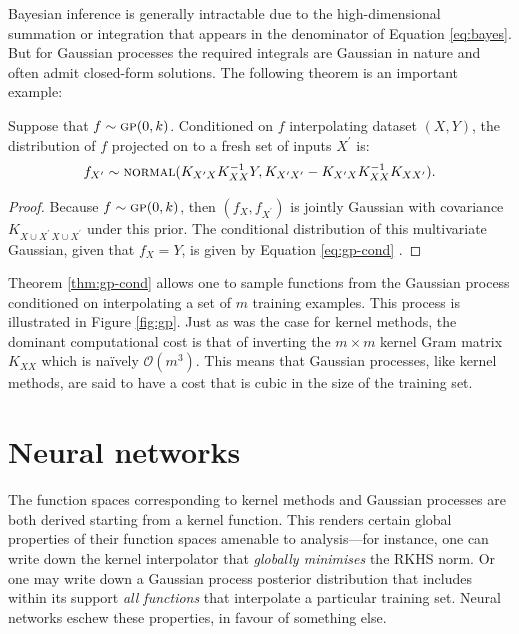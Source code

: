 \begin{refsection}
Bayesian inference is generally intractable due to the high-dimensional summation or integration that appears in the denominator of Equation \ref{eq:bayes}. But for Gaussian processes the required integrals are Gaussian in nature and often admit closed-form solutions. The following theorem is an important example:
\begin{theorem}\label{thm:gp-cond} Suppose that $f\sim\textsc{gp}(0,k)$. Conditioned on $f$ interpolating dataset $(X,Y)$, the distribution of $f$ projected on to a fresh set of inputs $X^\prime$ is:
\begin{equation}\label{eq:gp-cond}
    f_{X^\prime} \sim \textsc{normal}(K_{X^\prime X}K_{XX}^{-1}Y, K_{X^\prime X^\prime}-K_{X^\prime X}K_{XX}^{-1}K_{X X^\prime}).
\end{equation}
\end{theorem}
\begin{proof}
    Because $f\sim\textsc{gp}(0,k)$, then $(f_X, f_{X^\prime})$ is jointly Gaussian with covariance $K_{X\cup X^\prime\,X\cup X^\prime}$ under this prior. The conditional distribution of this multivariate Gaussian, given that $f_X=Y$, is given by Equation \ref{eq:gp-cond} \citep{bishop}.
\end{proof}

Theorem \ref{thm:gp-cond} allows one to sample functions from the Gaussian process conditioned on interpolating a set of $m$ training examples. This process is illustrated in Figure \ref{fig:gp}. Just as was the case for kernel methods, the dominant computational cost is that of inverting the $m\times m$ kernel Gram matrix $K_{XX}$ which is naïvely $\mathcal{O}(m^3)$. This means that Gaussian processes, like kernel methods, are said to have a cost that is cubic in the size of the training set.

\section{Neural networks}

The function spaces corresponding to kernel methods and Gaussian processes are both derived starting from a kernel function. This renders certain global properties of their function spaces amenable to analysis---for instance, one can write down the kernel interpolator that \textit{globally minimises} the RKHS norm. Or one may write down a Gaussian process posterior distribution that includes within its support \textit{all functions} that interpolate a particular training set. Neural networks eschew these properties, in favour of something else.


\end{refsection}
